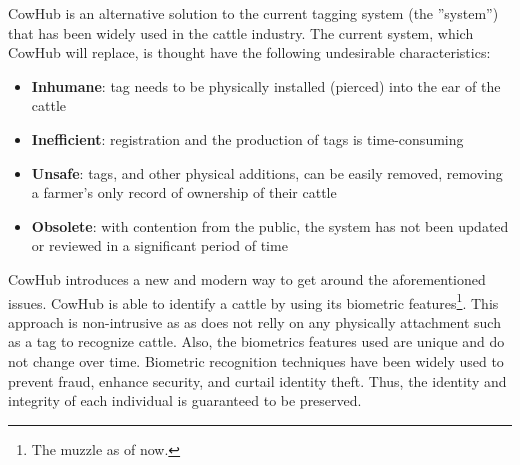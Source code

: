 CowHub is an alternative solution to the current tagging system (the ''system'') that has been widely used in the cattle industry. The current system, which CowHub will replace, is thought have the following undesirable characteristics:

\begin{itemize}
	\item \textbf{Inhumane}: tag needs to be physically installed (pierced) into the ear of the cattle
	\item \textbf{Inefficient}: registration and the production of tags is time-consuming
	\item \textbf{Unsafe}: tags, and other physical additions, can be easily removed, removing a farmer's only record of ownership of their cattle
	\item \textbf{Obsolete}: with contention from the public, the system has not been updated or reviewed in a significant period of time
\end{itemize}

CowHub introduces a new and modern way to get around the aforementioned issues. CowHub is able to identify a cattle by using its biometric features\footnote{The muzzle as of now.}. This approach is non-intrusive as as does not relly on any physically attachment such as a tag to recognize cattle. Also, the biometrics features used are unique and do not change over time. Biometric recognition techniques have been widely used to prevent fraud, enhance security, and curtail identity theft\cite{biometrics}. Thus, the identity and integrity of each individual is guaranteed to be preserved.
